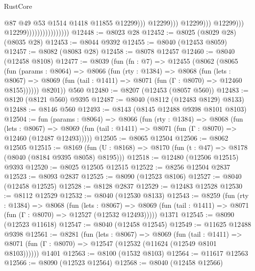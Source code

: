\begin{lexlean}{RustCore}
\begin{coremodule}
                                                            @87
                                                            @49
                                                            @53
                                                            @1514
                                                            @1418
                                                            @11855
                                                            @12299)))
                                                      @12299)))
                                                @12299)))
                                          @12299)))
                                    @12299))))))))))))))))
@12448 := @8023 @28
@12452 := @8025 (@8029 @28) (@8035 @28)
@12453 := @8044 @9392
@12455 := @8040 (@12453 @8059)
@12457 := @8082 (@8083 @28)
@12458 := @8078 @12457
@12460 := @8040 (@12458 @8108)
@12477 := @8039
    (fun (fn : @7) =>
    @12455
      (@8062
        (@8065
          (fun (params : @8064) =>
          @8066
            (fun (rty : @1384) =>
            @8068
              (fun (lets : @8067) =>
              @8069 (fun (tail : @1411) => @8071 (fun (Γ : @8070) => @12460 @8155))))))
        @8201))
    @560
@12480 := @8207 (@12453 (@8057 @560))
@12483 := @8120 (@8121 @560) @9395
@12487 := @8040 (@8112 (@12483 @8129) @8133)
@12488 := @8146 @560
@12493 := @8143 (@8145 @12488 @9398 @8101 @8103)
@12504 := fun (params : @8064) =>
  @8066
    (fun (rty : @1384) =>
    @8068
      (fun (lets : @8067) =>
      @8069 (fun (tail : @1411) => @8071 (fun (Γ : @8070) => @12460 (@12487 @12493)))))
@12505 := @8065 @12504
@12506 := @8062 @12505
@12515 := @8169
    (fun (U : @8168) => @8170 (fun (t : @47) => @8178 (@8040 (@8184 @9395 @8058) @8195)))
@12518 := @12480 (@12506 @12515) @9393
@12520 := @8025 @12505 @12515
@12522 := @8256 @12504 @2837
@12523 := @8093 @2837
@12525 := @8090 (@12523 @8106)
@12527 := @8040 (@12458 @12525)
@12528 := @8128 @2837
@12529 := @12483 @12528
@12530 := @8112 @12529
@12532 := @8040 (@12530 @8133)
@12543 := @8259
    (fun (rty : @1384) =>
    @8068
      (fun (lets : @8067) =>
      @8069 (fun (tail : @1411) => @8071 (fun (Γ : @8070) => @12527 (@12532 @12493)))))
    @1371
@12545 := @8090 (@12523 @11618)
@12547 := @8040 (@12458 @12545)
@12549 := @11625 @12488 @9398
@12561 := @8281
    (fun (lets : @8067) =>
    @8069
      (fun (tail : @1411) =>
      @8071 (fun (Γ : @8070) => @12547 (@12532 (@11624 (@12549 @8101 @8103))))))
    @1401
@12563 := @8100 (@1532 @8103)
@12564 := @11617 @12563
@12566 := @8090 (@12523 @12564)
@12568 := @8040 (@12458 @12566)

\end{coremodule}
\end{lexlean}

